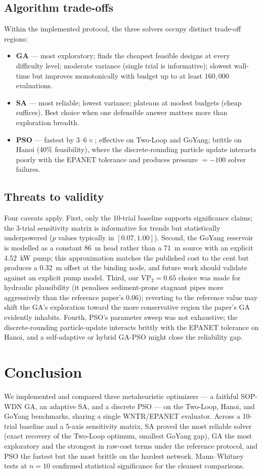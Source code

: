 \documentclass[conference]{IEEEtran}
\begin{document}
\subsection{Algorithm trade-offs}
Within the implemented protocol, the three solvers occupy distinct trade-off regions:
\begin{itemize}
\item \textbf{GA} --- most exploratory; finds the cheapest feasible designs at every difficulty level; moderate variance (single trial is informative); slowest wall-time but improves monotonically with budget up to at least $160{,}000$ evaluations.
\item \textbf{SA} --- most reliable; lowest variance; plateaus at modest budgets (cheap suffices). Best choice when one defensible answer matters more than exploration breadth.
\item \textbf{PSO} --- fastest by $3$--$6\times$; effective on Two-Loop and GoYang; brittle on Hanoi (40\% feasibility), where the discrete-rounding particle update interacts poorly with the EPANET tolerance and produces pressure $=-100$ solver failures.
\end{itemize}

\subsection{Threats to validity}
Four caveats apply. First, only the 10-trial baseline supports significance claims; the 3-trial sensitivity matrix is informative for trends but statistically underpowered ($p$ values typically in $[0.07,1.00]$). Second, the GoYang reservoir is modelled as a constant 86~m head rather than a 71~m source with an explicit 4.52~kW pump; this approximation matches the published cost to the cent but produces a 0.32~m offset at the binding node, and future work should validate against an explicit pump model. Third, our $\mathrm{VP}_2=0.65$ choice was made for hydraulic plausibility (it penalises sediment-prone stagnant pipes more aggressively than the reference paper's $0.06$); reverting to the reference value may shift the GA's exploration toward the more conservative region the paper's GA evidently inhabits. Fourth, PSO's parameter sweep was not exhaustive; the discrete-rounding particle-update interacts brittly with the EPANET tolerance on Hanoi, and a self-adaptive or hybrid GA-PSO might close the reliability gap.

\section{Conclusion}
\label{sec:conclusion}
We implemented and compared three metaheuristic optimizers --- a faithful SOP-WDN GA, an adaptive SA, and a discrete PSO --- on the Two-Loop, Hanoi, and GoYang benchmarks, sharing a single WNTR/EPANET evaluator. Across a 10-trial baseline and a 5-axis sensitivity matrix, SA proved the most reliable solver (exact recovery of the Two-Loop optimum, smallest GoYang gap), GA the most exploratory and the strongest in raw-cost terms under the reference protocol, and PSO the fastest but the most brittle on the hardest network. Mann--Whitney tests at $n=10$ confirmed statistical significance for the cleanest comparisons.
\end{document}
